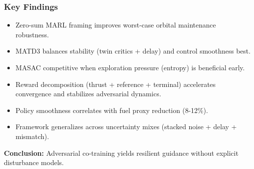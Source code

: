 \begin{frame}
  \frametitle{Key Findings}
  \small
  \begin{itemize}\setlength{\itemsep}{5pt}
    \item Zero-sum MARL framing improves worst-case orbital maintenance robustness.
    \item MATD3 balances stability (twin critics + delay) and control smoothness best.
    \item MASAC competitive when exploration pressure (entropy) is beneficial early.
    \item Reward decomposition (thrust + reference + terminal) accelerates convergence and stabilizes adversarial dynamics.
    \item Policy smoothness correlates with fuel proxy reduction (8-12\%).
    \item Framework generalizes across uncertainty mixes (stacked noise + delay + mismatch).
  \end{itemize}
  \vspace{4pt}
  \textbf{Conclusion:} Adversarial co-training yields resilient guidance without explicit disturbance models.
\end{frame}
